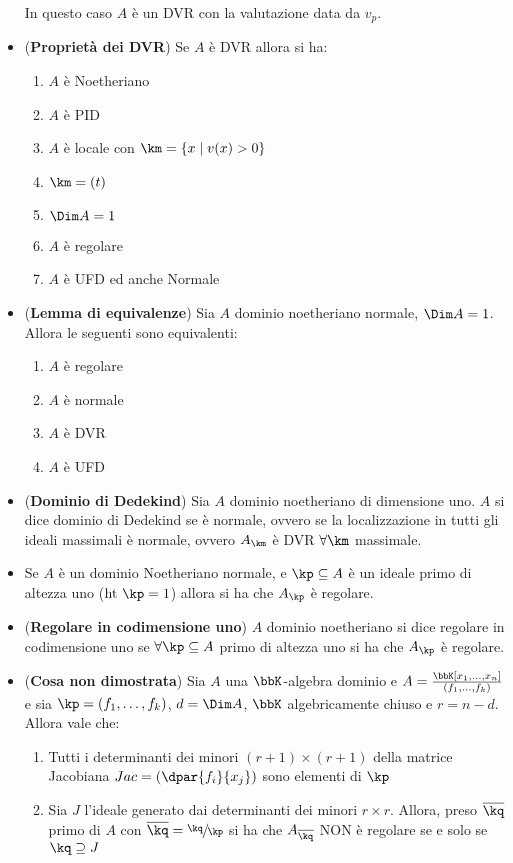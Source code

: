 \documentclass[a4paper,NoNotes,GeneralMath]{stdmdoc}
\newcommand{\Ht}{\text{ht }}
\newcommand{\lbr}[1]{\ensuremath{{\left( {#1} \right)}}}
\newcommand{\ov}{\overline}
\begin{document}
\begin{itemize}
  In questo caso $A$ è un DVR con la valutazione data da $v_p$.
\item ({\bf Proprietà dei DVR}) Se $A$ è DVR allora si ha:
  \begin{enumerate}
  \item $A$ è Noetheriano
  \item $A$ è PID
  \item $A$ è locale con $\km = \{ x \mid v(x) > 0 \}$
  \item $\km = (t)$
  \item $\Dim A = 1$
  \item $A$ è regolare
  \item $A$ è UFD ed anche Normale
  \end{enumerate}
\item ({\bf Lemma di equivalenze}) Sia $A$ dominio noetheriano normale,
  $\Dim A = 1$. Allora le seguenti sono equivalenti:
  \begin{enumerate}
  \item $A$ è regolare
  \item $A$ è normale
  \item $A$ è DVR
  \item $A$ è UFD
  \end{enumerate}
\item ({\bf Dominio di Dedekind}) Sia $A$ dominio noetheriano di
  dimensione uno. $A$ si dice dominio di Dedekind se è normale, ovvero
  se la localizzazione in tutti gli ideali massimali è normale, ovvero
  $A_\km$ è DVR $\forall \km$ massimale.
\item Se $A$ è un dominio Noetheriano normale, e $\kp \subseteq A$ è un
  ideale primo di altezza uno ($\Ht \kp = 1$) allora si ha che $A_\kp$ è
  regolare.
\item ({\bf Regolare in codimensione uno}) $A$ dominio noetheriano si
  dice regolare in codimensione uno se $\forall \kp \subseteq A$ primo
  di altezza uno si ha che $A_\kp$ è regolare.
\item ({\bf Cosa non dimostrata}) Sia $A$ una $\bbK$-algebra dominio e
  $A = \frac{\bbK[x_1, \ldots, x_n]}{(f_1, \ldots, f_k)}$ e sia $\kp =
  (f_1, \ldots, f_k)$, $d = \Dim A$, $\bbK$ algebricamente chiuso e $r =
  n - d$. Allora vale che:
  \begin{enumerate}
  \item Tutti i determinanti dei minori $(r + 1) \times (r + 1)$ della
    matrice Jacobiana $Jac = \lbr{\dpar{f_i}{x_j}}$ sono elementi di
    $\kp$
  \item Sia $J$ l'ideale generato dai determinanti dei minori
    $r \times r$. Allora, preso $\ov{\kq}$ primo di $A$ con $\ov{\kq} =
    \sfrac{\kq}{\kp}$ si ha che $A_{\ov\kq}$ NON è regolare se e solo se
    $\kq \supseteq J$


\end{enumerate}
\end{itemize}
\end{document}
